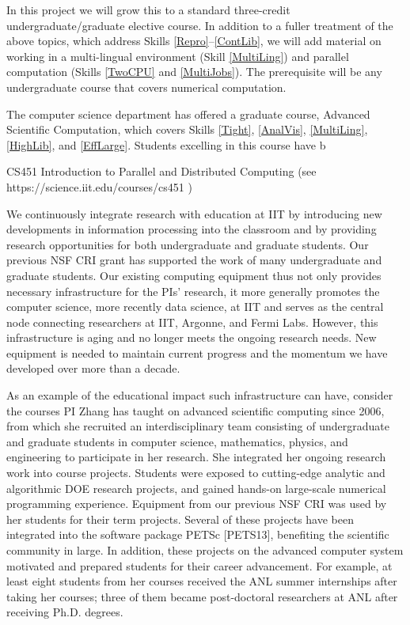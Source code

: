 \documentclass[11pt]{NSFamsart}
\begin{document}
In this project we will grow this to a standard three-credit undergraduate/graduate elective course.  In addition to a fuller treatment of the above topics, which address Skills \ref{Repro}--\ref{ContLib}, we will add material on working in a multi-lingual environment (Skill \ref{MultiLing}) and parallel computation (Skills \ref{TwoCPU} and \ref{MultiJobs}).  The prerequisite will be any undergraduate course that covers numerical computation.

The computer science department has offered a graduate course, Advanced Scientific Computation, which covers Skills \ref{Tight}, \ref{AnalVis}, \ref{MultiLing}, \ref{HighLib}, and \ref{EffLarge}.  Students excelling in this course have b

CS451 Introduction to Parallel and Distributed Computing (see https://science.iit.edu/courses/cs451 )

We continuously integrate research with education at IIT by introducing new developments in information processing into the classroom and by providing research opportunities for both undergraduate and graduate students. Our previous NSF CRI grant has supported the work of many undergraduate and graduate students. Our existing computing equipment thus not only provides necessary infrastructure for the PIs' research, it more generally promotes the computer science, more recently data science, at IIT and serves as the central node connecting researchers at IIT, Argonne, and Fermi Labs. However, this infrastructure is aging and no longer meets the ongoing research needs. New equipment is needed to maintain current progress and the momentum we have developed over more than a decade.  

As an example of the educational impact such infrastructure can have, consider the courses PI Zhang has taught on advanced scientific computing since 2006, from which she recruited an interdisciplinary team consisting of undergraduate and graduate students in computer science, mathematics, physics, and engineering to participate in her research. She integrated her ongoing research work into course projects. Students were exposed to cutting-edge analytic and algorithmic DOE research projects, and gained hands-on large-scale numerical programming experience. Equipment from our previous NSF CRI was used by her students for their term projects. Several of these projects have been integrated into the software package PETSc [PETS13], benefiting the scientific community in large. In addition, these projects on the advanced computer system motivated and prepared students for their career advancement. For example, at least eight students from her courses received the ANL summer internships after taking her courses; three of them became post-doctoral researchers at ANL after receiving Ph.D. degrees. 
\end{document}
